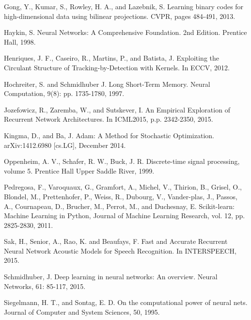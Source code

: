 \documentclass[a4paper,11pt]{article}
\begin{document}
\begin{thebibliography}{1}
  Gong, Y., Kumar, S., Rowley, H. A., and Lazebnik, S. Learning binary codes for high-dimensional data using bilinear projections. CVPR, pages 484-491, 2013.



 Haykin, S. Neural Networks: A Comprehensive Foundation. 2nd Edition. Prentice Hall, 1998.


 Henriques,  J. F.,  Caseiro, R.,  Martins, P.,  and Batista, J.   Exploiting the Circulant Structure of Tracking-by-Detection with Kernels.   In ECCV, 2012.


 Hochreiter, S.  and  Schmidhuber J. Long  Short-Term  Memory. Neural  Computation, 9(8): pp. 1735-1780, 1997.


 Jozefowicz, R., Zaremba, W., and Sutskever, I. An Empirical Exploration of Recurrent Network Architectures. In ICML2015, p.p. 2342-2350, 2015.


 Kingma,  D.,  and  Ba,  J.
Adam:   A  Method  for Stochastic Optimization. arXiv:1412.6980 [cs.LG], December 2014.


 Oppenheim,  A.  V.,  Schafer, R. W.,  Buck,  J. R. Discrete-time signal processing, volume 5.  Prentice Hall Upper Saddle River, 1999.

 Pedregosa, F., Varoquaux, G.,  Gramfort, A.,  Michel, V., Thirion, B., Grisel, O., Blondel, M., Prettenhofer, P.,  Weiss, R., Dubourg, V.,  Vander-plas, J., Passos, A., Cournapeau, D., Brucher, M., Perrot, M., and Duchesnay, E. Scikit-learn: Machine Learning in Python, Journal of Machine Learning Research, vol. 12, pp. 2825-2830, 2011.


 Sak, H., Senior, A., Rao, K. and Beaufays, F. Fast and Accurate Recurrent Neural Network Acoustic Models for Speech Recognition. In INTERSPEECH, 2015.

  Schmidhuber, J. Deep  learning  in  neural  networks:  An  overview. Neural  Networks,  61: 85-117, 2015.


 Siegelmann, H. T., and Sontag, E. D.  On
the  computational  power  of  neural  nets.
Journal of Computer and System Sciences, 50, 1995.





\end{thebibliography}
\end{document}
